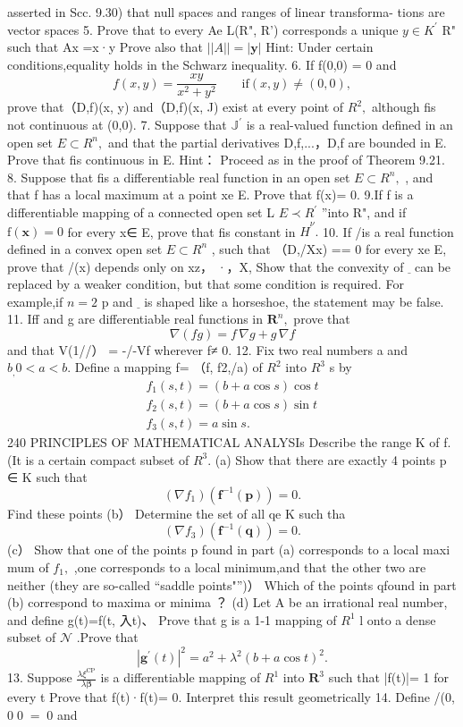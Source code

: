 asserted in Scc. 9.30) that null spaces and ranges of linear transforma- tions are vector spaces 5. Prove that to every Ae L(R", R') corresponds a unique $\scriptstyle y\in K^{\prime}$ R" such that Ax =x·y Prove also that $||A||=|\mathbf{y}|$ Hint: Under certain conditions,equality holds in the Schwarz inequality. 6. If f(0,0) = 0 and $$ f(x,y)=\frac{x y}{x^{2}+y^{2}}\qquad\mathrm{if}\left(x,y\right)\neq(0,0), $$ prove that（D,f)(x, y) and（D,f)(x, J) exist at every point of $\textstyle R^{2},$ although fis not continuous at (0,0). 7. Suppose that $\mathbb{J}^{\prime}$ is a real-valued function defined in an open set $E\subset R^{n},$ and that the partial derivatives D,f,...，D,f are bounded in E. Prove that fis continuous in E. Hint： Proceed as in the proof of Theorem 9.21. 8. Suppose that fis a differentiable real function in an open set $E\subset R^{n},$ , and that f has a local maximum at a point xe E. Prove that f(x)= 0. 9.If f is a differentiable mapping of a connected open set L $E\prec R^{\prime}$ ”into R", and if $\mathrm{f}\left(\mathbf{x}\right)=0$ for every x∈ E, prove that fis constant in ${\hat{H}}^{\nu}.$ 10. If /is a real function defined in a convex open set $E\subset R^{n}$ , such that （D,/Xx) == 0 for every xe E, prove that /(x) depends only on xz， ·，X, Show that the convexity of $\underline{{\mathbf{}}}$ can be replaced by a weaker condition, but that some condition is required. For example,if $n=2$ p and $\underline{{\mathbf{}}}$ is shaped like a horseshoe, the statement may be false. 11. Iff and g are differentiable real functions in ${\boldsymbol{R}}^{n},$ prove that $$ \nabla(f g)=f\,\nabla g+g\,\nabla f $$ and that V(1//） = -/-Vf wherever f≠ 0. 12. Fix two real numbers a and $b_{\mathrm{,}}0<a<b.$ Define a mapping f= （f, f2,/a) of $R^{2}$ into $\textstyle R^{3}$ s by $$ \begin{array}{l}{{f_{1}(s,t)=(b+a\cos s)\cos t}}\\ {{f_{2}(s,t)=(b+a\cos s)\sin t}}\\ {{f_{3}(s,t)=a\sin s.}}\end{array} $$240 PRINCIPLES OF MATHEMATICAL ANALYSIs Describe the range K of f.(It is a certain compact subset of $R^{3}.$ (a) Show that there are exactly 4 points p ∈ K such that $$ (\nabla f_{1})(\mathbf{f}^{-1}(\mathbf{p}))=0. $$ Find these points (b） Determine the set of all qe K such tha $$ (\nabla f_{3})(\mathbf{f}^{-1}(\mathbf{q}))=0. $$ (c） Show that one of the points p found in part (a) corresponds to a local maxi mum of $f_{1},$ ,one corresponds to a local minimum,and that the other two are neither (they are so-called “saddle points"”)） Which of the points qfound in part (b) correspond to maxima or minima ？ (d) Let A be an irrational real number, and define g(t)=f(t, 入t)、 Prove that g is a 1-1 mapping of $\textstyle R^{1}$ l onto a dense subset of $\textstyle{\mathcal{N}}$ .Prove that $$ |\mathbf{g}^{\prime}(t)|^{2}=a^{2}+\lambda^{2}(b+a\cos t)^{2}. $$ 13. Suppose $\frac{\lambda\xi^{\mathrm{CP}}}{\lambda\mathbf{\beta}}$ is a differentiable mapping of $\textstyle R^{1}$ into ${\boldsymbol{R}}^{3}$ such that |f(t)|= 1 for every t Prove that f(t)·f(t)= 0. Interpret this result geometrically 14. Define /(0, $\scriptstyle0\;0\;=\;0$ and $$ 